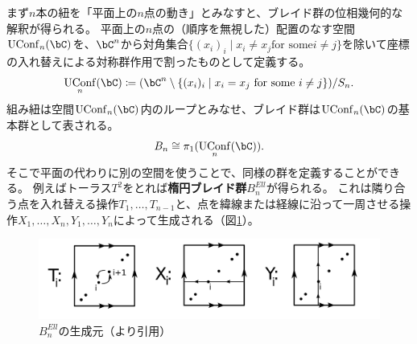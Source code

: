 \documentclass[uplatex,11pt,a4paper,dvipdfmx]{jsarticle}
\numberwithin{equation}{section}
\numberwithin{figure}{section}
\theoremstyle{definition}
\DeclareMathOperator{\UConf}{UConf}
\begin{document}
まず$n$本の紐を「平面上の$n$点の動き」とみなすと、ブレイド群の位相幾何的な解釈が得られる。
平面上の$n$点の（順序を無視した）配置のなす空間$\UConf_n(\bC)$を、$\bC^n$から対角集合$\{(x_i)_i \mid x_i \neq x_j \text{for some} i \neq j\}$を除いて座標の入れ替えによる対称群作用で割ったものとして定義する。
\begin{equation}
    \UConf_n(\bC) \coloneq (\bC^n \setminus \{(x_i)_i \mid x_i = x_j \text{ for some } i \neq j\}) / S_n.
\end{equation}
組み紐は空間$\UConf_n(\bC)$内のループとみなせ、ブレイド群は$\UConf_n(\bC)$の基本群として表される。
\begin{equation}
    B_n \cong \pi_1(\UConf_n(\bC)).
\end{equation}
そこで平面の代わりに別の空間を使うことで、同様の群を定義することができる。
例えばトーラス$T^2$をとれば\textbf{楕円ブレイド群}$B^{Ell}_n$が得られる。
これは隣り合う点を入れ替える操作$T_1, \dots, T_{n-1}$と、点を緯線または経線に沿って一周させる操作$X_1, \dots, X_n, Y_1, \dots, Y_n$によって生成される（図\ref{fig:generator-for-elliptic-braid-group}）。
\begin{figure}[h]
    \includegraphics[width=150mm]{../images/elliptic_braid_group.png}
    \caption{$B^{Ell}_n$の生成元（\cite{MR2507111}より引用）}
    \label{fig:generator-for-elliptic-braid-group}
\end{figure}
\end{document}

